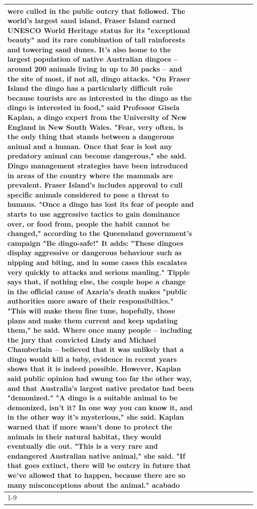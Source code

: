 \begin{table}[H]
\begin{tabular}{lllrlllll}
were culled in the public outcry that followed. The world's largest sand island, Fraser Island earned UNESCO World Heritage status for its "exceptional beauty" and its rare combination of tall rainforests and towering sand dunes. It's also home to the largest population of native Australian dingoes -- around 200 animals living in up to 30 packs -- and the site of most, if not all, dingo attacks. "On Fraser Island the dingo has a particularly difficult role because tourists are as interested in the dingo as the dingo is interested in food," said Professor Gisela Kaplan, a dingo expert from the University of New England in New South Wales. "Fear, very often, is the only thing that stands between a dangerous animal and a human. Once that fear is lost any predatory animal can become dangerous," she said. Dingo management strategies have been introduced in areas of the country where the mammals are prevalent. Fraser Island's includes approval to cull specific animals considered to pose a threat to humans. "Once a dingo has lost its fear of people and starts to use aggressive tactics to gain dominance over, or food from, people the habit cannot be changed," according to the Queensland government's campaign "Be dingo-safe!" It adds: "These dingoes display aggressive or dangerous behaviour such as nipping and biting, and in some cases this escalates very quickly to attacks and serious mauling." Tipple says that, if nothing else, the couple hope a change in the official cause of Azaria's death makes "public authorities more aware of their responsibilties." "This will make them fine tune, hopefully, those plans and make them current and keep updating them," he said. Where once many people -- including the jury that convicted Lindy and Michael Chamberlain -- believed that it was unlikely that a dingo would kill a baby, evidence in recent years shows that it is indeed possible. However, Kaplan said public opinion had swung too far the other way, and that Australia's largest native predator had been "demonized." "A dingo is a suitable animal to be demonized, isn't it? In one way you can know it, and in the other way it's mysterious," she said. Kaplan warned that if more wasn't done to protect the animals in their natural habitat, they would eventually die out. "This is a very rare and endangered Australian native animal," she said. "If that goes extinct, there will be outcry in future that we've allowed that to happen, because there are so many misconceptions about the animal." acabado \\
\cline{1-9}

\end{tabular}
\end{table}
